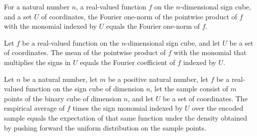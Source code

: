 \begin{theorem}
\label{FABL.fourierOneNorm_pointwise_mul_monomial}
\leanok
{}
For a natural number $n$, a real-valued function $f$ on the $n$-dimensional sign cube,
and a set $U$ of coordinates, the Fourier one-norm of the pointwise product of $f$ with
the monomial indexed by $U$ equals the Fourier one-norm of $f$.
\end{theorem}

\begin{theorem}
\label{FABL.mean_pointwise_mul_monomial}
\leanok
{}
Let $f$ be a real-valued function on the $n$-dimensional sign cube, and let $U$ be a set
of coordinates. The mean of the pointwise product of $f$ with the monomial that
multiplies the signs in $U$ equals the Fourier coefficient of $f$ indexed by $U$.
\end{theorem}

\begin{theorem}
\label{FABL.smallBiasFourierEstimate_eq_uniformPushforward_expectation}
\leanok
{}
Let $n$ be a natural number, let $m$ be a positive natural number, let $f$ be a
real-valued function on the sign cube of dimension $n$, let the sample consist of $m$
points of the binary cube of dimension $n$, and let $U$ be a set of coordinates. The
empirical average of $f$ times the sign monomial indexed by $U$ over the encoded sample
equals the expectation of that same function under the density obtained by pushing
forward the uniform distribution on the sample points.
\end{theorem}

